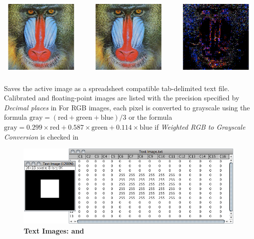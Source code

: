 \begin{infobox}
\noindent \centering{}\includegraphics[width=1\columnwidth]{images/JpegArtifacts}
\end{infobox}
{\small \par}


\subsubsection{\protect{}\label{sub:SaveAs>Text-Image...}}

Saves the active image as a spreadsheet compatible tab-delimited text
file. Calibrated and floating-point images are listed with the precision
specified by \emph{Decimal places} in 
For RGB images, each pixel is converted to grayscale using the formula
$\text{gray}=(\text{red}+\text{green}+\text{blue})/3$ or the formula
$\text{gray}=0.299\times\text{red}+0.587\times\text{green}+0.114\times\text{blue}$
if \emph{Weighted RGB to Grayscale Conversion} is checked in  



\begin{figure}
\noindent \includegraphics[width=1\columnwidth]{images/TextImage}\caption[Text Images]{\textbf{\label{fig:TextImages}Text Images: \protect{}
and \protect{}}}
\end{figure}



